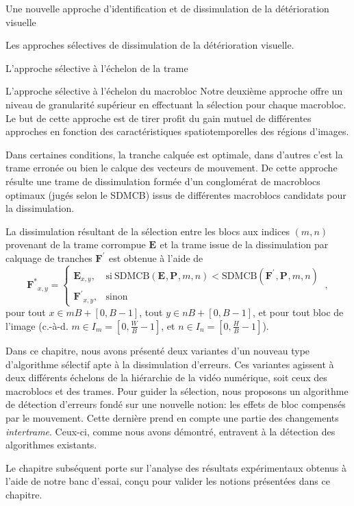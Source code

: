 \documentclass[letterpaper, twoside, 12pt,memoire]{thETS}
\newcommand{\SC}[1]{%
	{
	\todo[inline,color={red!100!green!33!}]{%
	\textbf{[SC]:}~#1}
	}}
\newcommand{\ltE}[1]{\mathbf{E}_{#1}}
\newcommand{\ltP}[1]{\mathbf{P}_{#1}}
\newcommand{\ltS}[1]{I_{#1}}
\newcommand{\ltSDMCB}[1]{\textrm{SDMCB}(#1,\ltP{},m,n)}
\newcommand{\ltConc}[1]{\mathbf{F^{\prime}}_{#1}}
\newcommand{\ltOpt}[1]{\mathbf{F^{*}}_{#1}}
\begin{document}
\begin{chapter}{Une nouvelle approche d'identification et de dissimulation de la
détérioration visuelle}
\begin{section}{Les approches sélectives de dissimulation de la détérioration
visuelle.}
\begin{subsection}{L'approche sélective à l'échelon de la trame}
\end{subsection}

\begin{subsection}{L'approche sélective à l'échelon du macrobloc}
\SC{à l'échel?}
\label{sect-SelectiveBloc}
Notre deuxième approche offre un niveau de granularité supérieur en effectuant
la sélection pour chaque macrobloc. Le but de cette approche est de tirer
profit du gain mutuel de différentes approches en fonction des
caractéristiques spatiotemporelles des régions d'images.

Dans certaines conditions, la tranche calquée est optimale, dans d'autres c'est
la trame erronée ou bien le calque des vecteurs de mouvement. De cette approche
résulte une trame de dissimulation formée d'un conglomérat de macroblocs
optimaux (jugés selon le SDMCB) issus de différentes macroblocs candidats pour la
dissimulation.

La dissimulation résultant de la sélection entre les blocs aux indices $(m,n)$
provenant de la trame corrompue $\ltE{}$ et la trame issue de la dissimulation
par calquage de tranches $\ltConc{}$ est obtenue à l'aide de
\begin{equation}
\label{eq-SelectiveConcealment}
\ltOpt{x,y} =
\begin{cases}
\ltE{x,y}, & \mathrm{si~} \ltSDMCB{\ltE{}} < \ltSDMCB{\ltConc{}}\\
\ltConc{x,y}, & \mathrm{sinon}
\end{cases}\:,
\end{equation}
pour tout $x\in mB+[0,B-1]$, tout $y \in nB+[0,B-1]$, et pour tout bloc de l'image (c.-à-d. $m \in \ltS{m}=[0,\frac{W}{B}-1]$, et $n \in
\ltS{n}=[0,\frac{H}{B}-1]$).
\end{subsection}
\end{section}

Dans ce chapitre, nous avons présenté deux variantes d'un nouveau type
d'algorithme sélectif apte à la dissimulation d'erreurs. Ces variantes agissent
à deux différents échelons de la hiérarchie de la vidéo numérique, soit ceux des
macroblocs et des trames. Pour guider la sélection, nous proposons un algorithme
de détection d'erreurs fondé sur une nouvelle notion: les effets de bloc
compensés par le mouvement. Cette dernière prend en compte une partie des
changements \textit{intertrame}. Ceux-ci, comme nous avons démontré,
entravent à la détection des algorithmes existants.

Le chapitre subséquent porte sur l'analyse des résultats expérimentaux obtenus
à l'aide de notre banc d'essai, conçu pour valider les notions présentées dans
ce chapitre.




\end{chapter}
\end{document}
